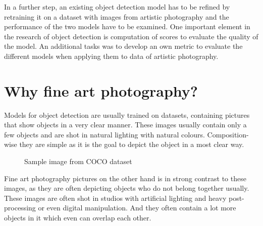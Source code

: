 In a further step, an existing object detection model has to be refined by retraining it on a dataset with images from artistic photography and the performance of the two models have to be examined.
One important element in the research of object detection is computation of scores to evaluate the quality of the model. An additional tasks was to develop an own metric to evaluate the different models when applying them to data of artistic photography.

\section{Why fine art photography?}
Models for object detection are usually trained on datasets, containing pictures that show objects in a very clear manner. These images usually contain only a few objects and are shot in natural lighting with natural colours. Composition-wise they are simple as it is the goal to depict the object in a most clear way.

\begin{figure}[H]
	\caption{\label{fig:coco-sample} Sample image from COCO dataset}
\end{figure}

Fine art photography pictures on the other hand is in strong contrast to these images, as they are often depicting objects who do not belong together usually. These images are often shot in studios with artificial lighting and heavy post-processing or even digital manipulation. And they often contain a lot more objects in it which even can overlap each other.

